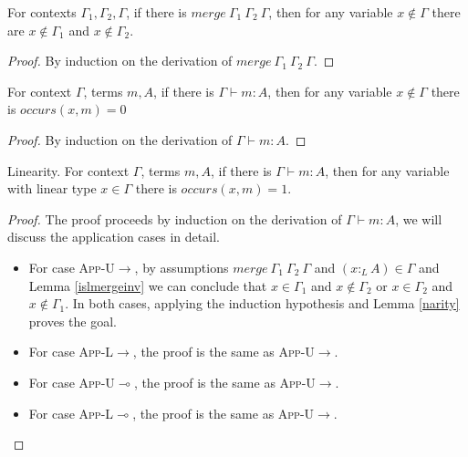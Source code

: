 \documentclass[sigplan,screen,review,anonymous]{acmart}
\newcommand{\rname}[1]{\textsc{\footnotesize #1}}
\newcommand{\ltype}{:_{\scriptscriptstyle L}}
\newcommand{\mrg}[3]{merge\ {#1}\ {#2}\ {#3}}
\begin{document}
\begin{lemma}
  For contexts $\Gamma_1, \Gamma_2, \Gamma$, if there is $\mrg{\Gamma_1}{\Gamma_2}{\Gamma}$, then for any variable $x \notin \Gamma$ there are $x \notin \Gamma_1$ and $x \notin \Gamma_2$.
\end{lemma}
\begin{proof}
  By induction on the derivation of $\mrg{\Gamma_1}{\Gamma_2}{\Gamma}$.
\end{proof}

\begin{lemma}\label{narity}
  For context $\Gamma$, terms $m, A$, if there is $\Gamma \vdash m : A$, then for any variable $x \notin \Gamma$ there is $occurs(x, m) = 0$
\end{lemma}
\begin{proof}
  By induction on the derivation of $\Gamma \vdash m : A$.
\end{proof}

\begin{theorem}\label{linearity}
  Linearity. For context $\Gamma$, terms $m, A$, if there is $\Gamma \vdash m : A$, then for any variable with linear type $x \in \Gamma$ there is $occurs(x, m) = 1$.
\end{theorem}
\begin{proof}
  The proof proceeds by induction on the derivation of $\Gamma \vdash m : A$, we will discuss the application cases in detail.
  \begin{itemize}
    \item For case \rname{App-U$\rightarrow$}, by assumptions $\mrg{\Gamma_1}{\Gamma_2}{\Gamma}$ and $(x \ltype A) \in \Gamma$ and Lemma \ref{islmergeinv} we can conclude that $x \in \Gamma_1$ and $x \notin \Gamma_2$ or $x \in \Gamma_2$ and $x \notin \Gamma_1$. In both cases, applying the induction hypothesis and Lemma \ref{narity} proves the goal.
    \item For case \rname{App-L$\rightarrow$}, the proof is the same as \rname{App-U$\rightarrow$}.
    \item For case \rname{App-U$\multimap$}, the proof is the same as \rname{App-U$\rightarrow$}.
    \item For case \rname{App-L$\multimap$}, the proof is the same as \rname{App-U$\rightarrow$}.
  \end{itemize}
\end{proof}
\end{document}
